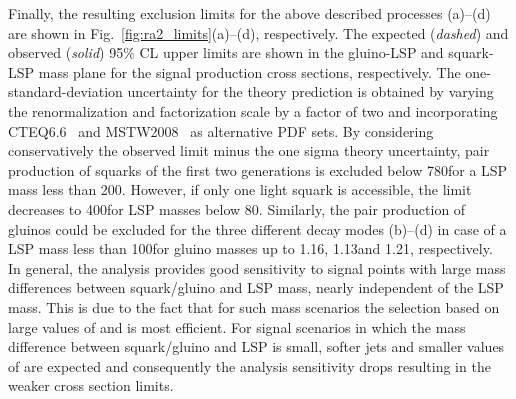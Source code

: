 Finally, the resulting exclusion limits for the above described processes (a)--(d) are shown in Fig.~\ref{fig:ra2_limits}(a)--(d), respectively. The expected (\textit{dashed}) and observed (\textit{solid}) 95\% CL upper limits are shown in the gluino-LSP and squark-LSP mass plane for the signal production cross sections, respectively. The one-standard-deviation uncertainty for the theory prediction is obtained by varying the renormalization and factorization scale by a factor of two and incorporating CTEQ6.6~\cite{Nadolsky:2008zw} and MSTW2008~\cite{Martin:2009iq} as alternative PDF sets. By considering conservatively the observed limit minus the one sigma theory uncertainty, pair production of squarks of the first two generations is excluded below 780\gev for a LSP mass less than 200\gev. However, if only one light squark is accessible, the limit decreases to 400\gev for LSP masses below 80\gev. Similarly, the pair production of gluinos could be excluded for the three different decay modes (b)--(d) in case of a LSP mass less than 100\gev for gluino masses up to 1.16\tev, 1.13\tev and 1.21\tev, respectively. \\
In general, the analysis provides good sensitivity to signal points with large mass differences between squark/gluino and LSP mass, nearly independent of the LSP mass. This is due to the fact that for such mass scenarios the selection based on large values of \HT and \MHT is most efficient. For signal scenarios in which the mass difference between squark/gluino and LSP is small, softer jets and smaller values of \MHT are expected and consequently the analysis sensitivity drops resulting in the weaker cross section limits.

